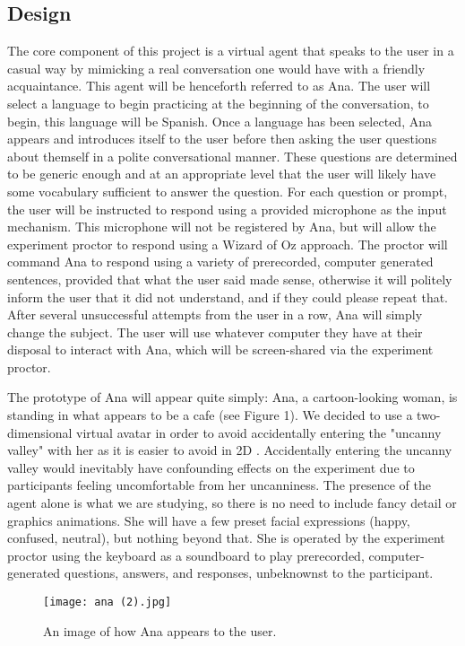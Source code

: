 \documentclass{vgtc}                          %
\begin{document}
\subsection{Design}
The core component of this project is a virtual agent that speaks to the user in a casual way by mimicking a real conversation one would have with a friendly acquaintance.
This agent will be henceforth referred to as Ana.
The user will select a language to begin practicing at the beginning of the conversation, to begin, this language will be Spanish.
Once a language has been selected, Ana appears and introduces itself to the user before then asking the user questions about themself in a polite conversational manner.
These questions are determined to be generic enough and at an appropriate level that the user will likely have some vocabulary sufficient to answer the question. For each question or prompt, the user will be instructed to respond using a provided microphone as the input mechanism.
This microphone will not be registered by Ana, but will allow the experiment proctor to respond using a Wizard of Oz approach.
The proctor will command Ana to respond using a variety of prerecorded, computer generated sentences, provided that what the user said made sense, otherwise it will politely inform the user that it did not understand, and if they could please repeat that.
After several unsuccessful attempts from the user in a row, Ana will simply change the subject. 
The user will use whatever computer they have at their disposal to interact with Ana, which will be screen-shared via the experiment proctor.

The prototype of Ana will appear quite simply: Ana, a cartoon-looking woman, is standing in what appears to be a cafe (see Figure 1).
We decided to use a two-dimensional virtual avatar in order to avoid accidentally entering the "uncanny valley" with her as it is easier to avoid in 2D \cite{Seymour:2019}.
Accidentally entering the uncanny valley would inevitably have confounding effects on the experiment due to participants feeling uncomfortable from her uncanniness. 
The presence of the agent alone is what we are studying, so there is no need to include fancy detail or graphics animations.
She will have a few preset facial expressions (happy, confused, neutral), but nothing beyond that.
She is operated by the experiment proctor using the keyboard as a soundboard to play prerecorded, computer-generated questions, answers, and responses, unbeknownst to the participant.
\begin{figure}[htp]
    \centering
    \texttt{[image: ana (2).jpg]}
    \caption{An image of how Ana appears to the user.}
    \label{fig:Ana}
\end{figure}
\end{document}
